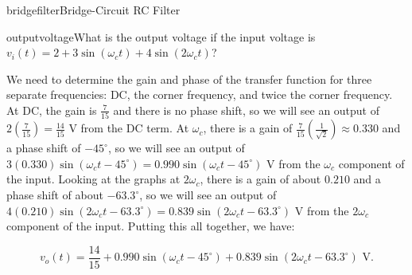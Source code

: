 \begin{mainquestion}{bridgefilter}{Bridge-Circuit RC Filter}
\begin{partquestion}{outputvoltage}{What is the output voltage if the input voltage is $v_{i}(t) = 2 + 3\sin\left(\omega_{c}t\right) + 4\sin\left(2\omega_{c}t\right)$?}
\begin{answer}
We need to determine the gain and phase of the transfer function for three separate frequencies: DC, the corner frequency, and twice the corner frequency. At DC, the gain is $\frac{7}{15}$ and there is no phase shift, so we will see an output of $2\left(\frac{7}{15}\right) = \frac{14}{15}\text{ V}$ from the DC term. At $\omega_{c}$, there is a gain of $\frac{7}{15}\left(\frac{1}{\sqrt{2}}\right) \approx 0.330$ and a phase shift of $-45^{\circ}$, so we will see an output of $3(0.330)\sin\left(\omega_{c}t - 45^{\circ}\right) = 0.990\sin\left(\omega_{c}t - 45^{\circ}\right)\text{ V}$ from the $\omega_{c}$ component of the input. Looking at the graphs at $2\omega_{c}$, there is a gain of about $0.210$ and a phase shift of about $-63.3^{\circ}$, so we will see an output of $4(0.210)\sin\left(2\omega_{c}t - 63.3^{\circ}\right) = 0.839\sin\left(2\omega_{c}t - 63.3^{\circ}\right)\text{ V}$ from the $2\omega_{c}$ component of the input. Putting this all together, we have:

\[
v_{o}(t) = \frac{14}{15} + 0.990\sin\left(\omega_{c}t - 45^{\circ}\right) + 0.839\sin\left(2\omega_{c}t - 63.3^{\circ}\right)\text{ V.}
\]
\end{answer}
\end{partquestion}

\end{mainquestion}